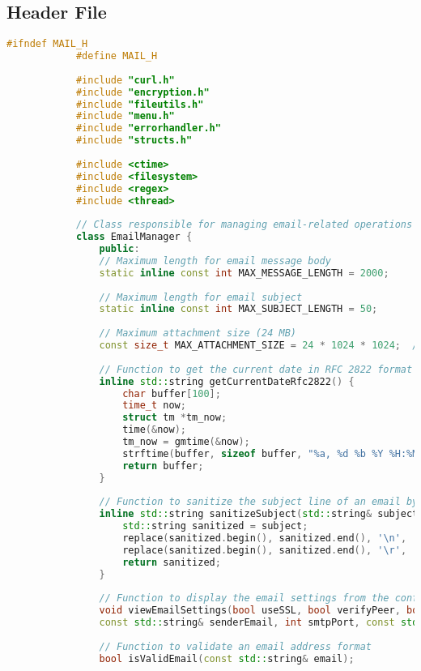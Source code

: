 \documentclass{article}
\begin{document}
	\subsection*{Header File}
	\begin{mdframed}[backgroundcolor=background, hidealllines=false, innerleftmargin=15pt, innerrightmargin=5pt, innertopmargin=0pt, innerbottommargin=-5pt, linecolor=accent]
		\begin{lstlisting}[language=C++]
			#ifndef MAIL_H
			#define MAIL_H
			
			#include "curl.h"
			#include "encryption.h"
			#include "fileutils.h"
			#include "menu.h"
			#include "errorhandler.h"
			#include "structs.h"
			
			#include <ctime>
			#include <filesystem>
			#include <regex>
			#include <thread>
			
			// Class responsible for managing email-related operations
			class EmailManager {
				public:
				// Maximum length for email message body
				static inline const int MAX_MESSAGE_LENGTH = 2000;
				
				// Maximum length for email subject
				static inline const int MAX_SUBJECT_LENGTH = 50;
				
				// Maximum attachment size (24 MB)
				const size_t MAX_ATTACHMENT_SIZE = 24 * 1024 * 1024;  // 24 MB in bytes
				
				// Function to get the current date in RFC 2822 format
				inline std::string getCurrentDateRfc2822() {
					char buffer[100];
					time_t now;
					struct tm *tm_now;
					time(&now);
					tm_now = gmtime(&now);
					strftime(buffer, sizeof buffer, "%a, %d %b %Y %H:%M:%S %Z", tm_now);
					return buffer;
				}
				
				// Function to sanitize the subject line of an email by replacing newline and carriage return characters with spaces
				inline std::string sanitizeSubject(std::string& subject) {
					std::string sanitized = subject;
					replace(sanitized.begin(), sanitized.end(), '\n', ' '); // replace newlines with spaces
					replace(sanitized.begin(), sanitized.end(), '\r', ' '); // replace carriage returns with spaces
					return sanitized;
				}
				
				// Function to display the email settings from the configuration file
				void viewEmailSettings(bool useSSL, bool verifyPeer, bool verifyHost, bool verbose,  
				const std::string& senderEmail, int smtpPort, const std::string& smtpServer);
				
				// Function to validate an email address format
				bool isValidEmail(const std::string& email);
				

\end{lstlisting}
\end{mdframed}
\end{document}
